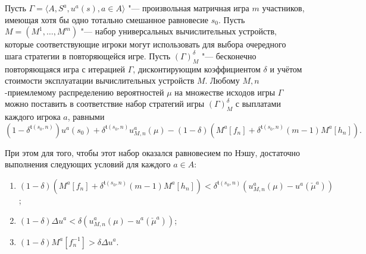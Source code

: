 \begin{theorem}
	Пусть $\Gamma = \langle A, S^a, u^a(s), a \in A \rangle$ "--- произвольная матричная игра $m$ участников, имеющая хотя бы одно тотально смешанное равновесие $s_0$. Пусть $M = (M^1, \ldots, M^m)$ "--- набор универсальных вычислительных устройств, которые соответствующие игроки могут использовать для выбора очередного шага стратегии в повторяющейся игре. Пусть $(\Gamma)_M^{\delta}$ "--- бесконечно повторяющаяся игра с итерацией $\Gamma$, дисконтирующим коэффициентом $\delta$ и учётом стоимости эксплуатации вычислительных устройств $M$. Любому $M,n$-приемлемому распределению вероятностей $\mu$ на множестве исходов игры $\Gamma$ можно поставить в соответствие набор стратегий игры $(\Gamma)_M^{\delta}$ с выплатами каждого игрока $a$, равными %
	\begin{equation*}
		(1 - \delta^{\mathfrak{t}(s_0, n)}) u^a(s_0) + \delta^{\mathfrak{t}(s_0, n)} u_{M,n}^a(\mu) - (1 - \delta) (M^a[f_n] + \delta^{\mathfrak{t}(s_0, n)} (m - 1) M^a[h_n]).
	\end{equation*}
	
	При этом для того, чтобы этот набор оказался равновесием по Нэшу, достаточно выполнения следующих условий для каждого $a \in A$:
	\begin{enumerate}
		\item $(1 - \delta) (M^a[f_n] + \delta^{\mathfrak{t}(s_0, n)} (m - 1) M^a[h_n]) < \delta^{\mathfrak{t}(s_0, n)}(u_{M,n}^a(\mu) - u^a(\check{\mu}^a))$;
		\item $(1 - \delta) \Delta u^a < \delta (u_{M,n}^a(\mu) - u^a(\check{\mu}^a))$;
		\item $(1 - \delta) M^a[f_n^{-1}] > \delta \Delta u^a$.
	\end{enumerate}
%
\end{theorem}

